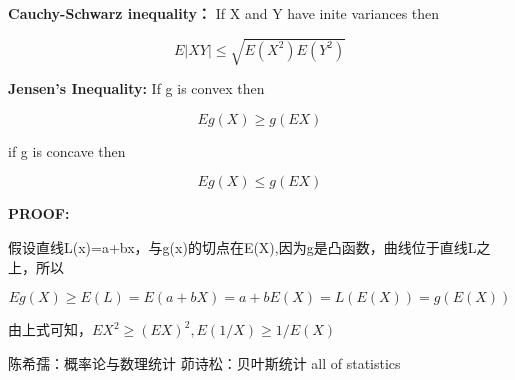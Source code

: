 \documentclass{ctexart}
\begin{document}
	\textbf{Cauchy-Schwarz inequality：} If X and Y have inite variances then
	
	\[E|XY| \leq \sqrt{E(X^2)E(Y^2)}\]
	
	\textbf{Jensen's Inequality:} If g is convex then
	
	\[Eg(X) \geq g(EX)\]
	
	if g is concave then
	
	\[Eg(X) \leq g(EX)\]
	
	\textbf{PROOF:}
	
	假设直线L(x)=a+bx，与g(x)的切点在E(X),因为g是凸函数，曲线位于直线L之上，所以
	
	\[Eg(X) \geq E(L)=E(a+bX)=a+bE(X)=L(E(X))=g(E(X))\]
	
	由上式可知，\(EX^2 \geq (EX)^2, E(1/X) \geq 1/E(X)\)
	
	
	
	
	
	
	\begin{thebibliography}{99}
		陈希孺：概率论与数理统计
		茆诗松：贝叶斯统计
		all of statistics
	\end{thebibliography}
\end{document}
